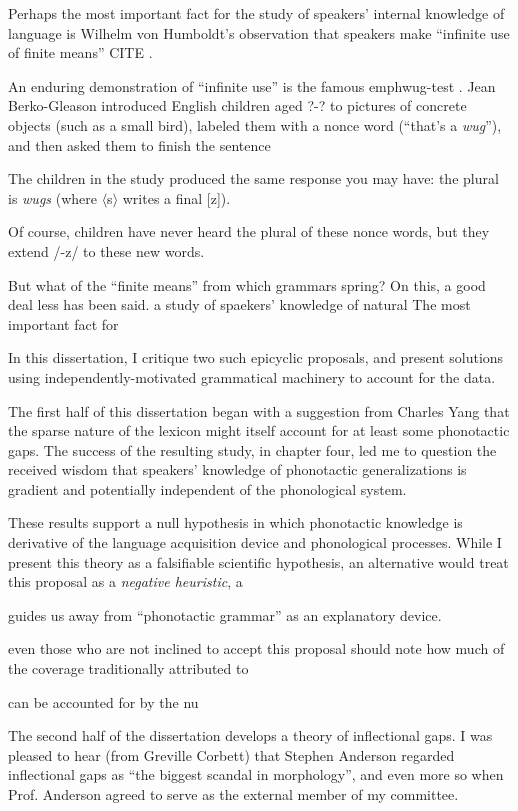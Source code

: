 
Perhaps the most important fact for the study of speakers' internal knowledge of language is Wilhelm von Humboldt's observation that speakers make ``infinite use of finite means'' CITE \citep{Chomsky1966}. 

An enduring demonstration of ``infinite use'' is the famous emph{wug-test} \citep{Berko1958}. Jean Berko-Gleason introduced English children aged ?-? to pictures of concrete objects (such as a small bird), labeled them with a nonce word (``that's a \emph{wug}''), and then asked them to finish the sentence

The children in the study produced the same response you may have: the plural is \emph{wugs} (where $\langle$s$\rangle$ writes a final [z]). 

Of course, children have never heard the plural of these nonce words, but they extend /-z/ to these new words. 

But what of the ``finite means'' from which grammars spring? On this, a good deal less has been said.
a study of spaekers' knowledge of natural
The most important fact for 

In this dissertation, I critique two such epicyclic proposals, and present solutions using independently-motivated grammatical machinery to account for the data. 

The first half of this dissertation began with a suggestion from Charles Yang that the sparse nature of the lexicon might itself account for at least some phonotactic gaps. The success of the resulting study, in chapter four, led me to question the received wisdom that speakers' knowledge of phonotactic generalizations is gradient and potentially independent of the phonological system. 

These results support a null hypothesis in which phonotactic knowledge is derivative of the language acquisition device and phonological processes. While I present this theory as a falsifiable scientific hypothesis, an alternative would treat this proposal as a \emph{negative heuristic}, a 

guides us away from ``phonotactic grammar'' as an explanatory device. 

even those who are not inclined to accept this proposal should note how much of the coverage traditionally attributed to

can be accounted for by the nu

The second half of the dissertation develops a theory of inflectional gaps. I was pleased to hear (from Greville Corbett) that Stephen Anderson regarded inflectional gaps as ``the biggest scandal in morphology'', and even more so when Prof. Anderson agreed to serve as the external member of my committee.

